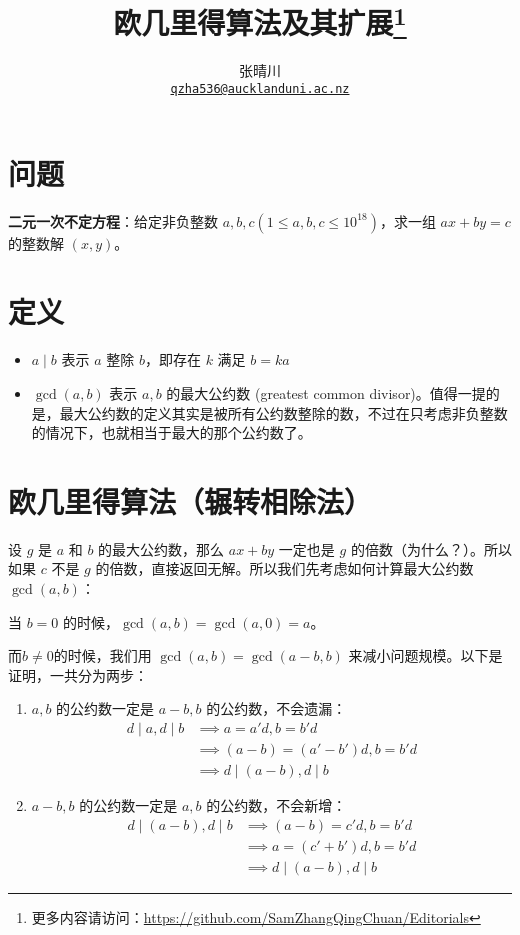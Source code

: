 \documentclass{article}
\title{欧几里得算法及其扩展\footnote{更多内容请访问：\url{https://github.com/SamZhangQingChuan/Editorials}}}
\author{张晴川\\\href{mailto:qzha536@aucklanduni.ac.nz}{\texttt{qzha536@aucklanduni.ac.nz}}}
\begin{document}
\maketitle
\section{问题}
\textbf{二元一次不定方程}：给定非负整数 $a,b,c(1 \le a,b,c \le 10^{18})$，求一组 $ax+by = c$ 的整数解 $(x,y)$。

\section{定义}
\begin{itemize}
\item $a\mid b$ 表示 $a$ 整除 $b$，即存在 $k$ 满足 $b = ka$
\item $\gcd(a,b)$ 表示 $a,b$ 的最大公约数 (greatest common divisor)。值得一提的是，最大公约数的定义其实是被所有公约数整除的数，不过在只考虑非负整数的情况下，也就相当于最大的那个公约数了。
\end{itemize}

\section{欧几里得算法（辗转相除法）}

设 $g$ 是 $a$ 和 $b$ 的最大公约数，那么 $ax+by$ 一定也是 $g$ 的倍数（为什么？）。所以如果 $c$ 不是 $g$ 的倍数，直接返回无解。所以我们先考虑如何计算最大公约数 $\gcd(a,b)$：

当 $b = 0$ 的时候，$\gcd(a,b) = \gcd(a,0) = a$。

而$b \neq 0$的时候，我们用 $\gcd(a,b) = \gcd(a-b,b)$ 来减小问题规模。以下是证明，一共分为两步：
\begin{enumerate}
\item $a,b$ 的公约数一定是 $a-b,b$ 的公约数，不会遗漏：
\begin{align*}
d \mid a,d \mid b 
&\implies a = a'd,b = b'd \\
&\implies (a-b) = (a'-b')d,b = b'd \\
&\implies d \mid (a-b), d \mid b
\end{align*}
\item $a-b,b$ 的公约数一定是 $a,b$ 的公约数，不会新增：
\begin{align*}
d \mid (a-b),d \mid b 
&\implies (a-b) = c'd,b = b'd \\
&\implies a = (c'+b')d,b = b'd \\
&\implies d \mid (a-b), d \mid b
\end{align*}

\end{enumerate}
\end{document}
